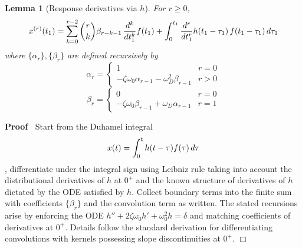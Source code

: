\documentclass{article}
\newenvironment{proof}{\noindent\textbf{Proof\ }}{\hspace*{\fill}$\Box$\medskip}
\newtheorem{lemma}{Lemma}
\begin{document}
\begin{lemma}
  [Response derivatives via $h$]\label{lem:deriv} For $r \ge 0$,
  \begin{equation}
    \label{eq:derivative_form} x^{(r)} (t_1) = \sum_{k = 0}^{r - 2}
    \binom{r}{k} \beta_{r - k - 1}  \hspace{0.17em} \frac{d^k}{dt_1^k} f (t_1)
    + \int_0^{t_1} \frac{d^r}{dt_1^r} h (t_1 - \tau_1)  \hspace{0.17em} f (t_1
    - \tau_1)  \hspace{0.17em} d \tau_1
  \end{equation}
  where $\{\alpha_r \}, \{\beta_r \}$ are defined recursively by
  \begin{equation}
    \alpha_r = \left\{\begin{array}{ll}
      1 & r = 0\\
      - \zeta \omega_0 \alpha_{r - 1} - \omega_D^2 \beta_{r - 1} & r > 0
    \end{array}\right.
  \end{equation}
  \begin{equation}
    \beta_r = \left\{\begin{array}{ll}
      0 & r = 0\\
      - \zeta \omega_0 \beta_{r - 1} + \omega_D \alpha_{r - 1} & r = 1
    \end{array}\right.
  \end{equation}
\end{lemma}

\begin{proof}
  Start from the Duhamel integral
  \begin{equation}
    x (t) = \int_0^t h (t - \tau) f (\tau)  \hspace{0.17em} d \tau
  \end{equation}
  , differentiate under the integral sign using Leibniz rule taking into
  account the distributional derivatives of $h$ at $0^+$ and the known
  structure of derivatives of $h$ dictated by the ODE satisfied by $h$.
  Collect boundary terms into the finite sum with coefficients $\{\beta_r \}$
  and the convolution term as written. The stated recursions arise by
  enforcing the ODE $h'' + 2 \zeta \omega_0 h' + \omega_0^2 h = \delta$ and
  matching coefficients of derivatives at $0^+$. Details follow the standard
  derivation for differentiating convolutions with kernels possessing slope
  discontinuities at $0^+$.
\end{proof}
\end{document}
